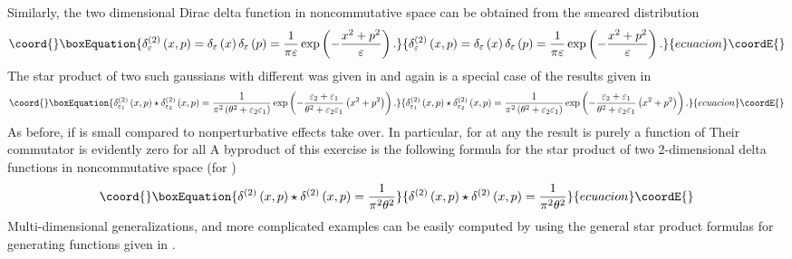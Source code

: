 \documentclass[a4paper,12pt]{article}
\begin{document}
Similarly, the two dimensional Dirac delta function in noncommutative space
can be obtained from the smeared distribution
\begin{equation}\coord{}\boxEquation{
\delta _{\varepsilon }^{\left( 2\right) }\left( x,p\right) =\delta
_{\varepsilon }\left( x\right) \delta _{\varepsilon }\left( p\right) =\frac{1
}{\pi \varepsilon }\exp \left( -\frac{x^{2}+p^{2}}{\varepsilon }\right) .
}{
\delta _{\varepsilon }^{\left( 2\right) }\left( x,p\right) =\delta
_{\varepsilon }\left( x\right) \delta _{\varepsilon }\left( p\right) =\frac{1
}{\pi \varepsilon }\exp \left( -\frac{x^{2}+p^{2}}{\varepsilon }\right) .
}{ecuacion}\coordE{}\end{equation}
The star product of two such gaussians with different \coordHE{} was given in \cite{bayen}\cite{baker} and again is a
special case of the results given in \cite{witmoy}
\begin{equation}\coord{}\boxEquation{
\delta _{\varepsilon _{1}}^{\left( 2\right) }\left( x,p\right) \star \delta
_{\varepsilon _{2}}^{\left( 2\right) }\left( x,p\right) =\frac{1}{\pi
^{2}\left( \theta ^{2}+\varepsilon _{2}\varepsilon _{1}\right) }\exp \left( -
\frac{\varepsilon _{2}+\varepsilon _{1}}{\theta ^{2}+\varepsilon
_{2}\varepsilon _{1}}\left( x^{2}+p^{2}\right) \right) .
}{
\delta _{\varepsilon _{1}}^{\left( 2\right) }\left( x,p\right) \star \delta
_{\varepsilon _{2}}^{\left( 2\right) }\left( x,p\right) =\frac{1}{\pi
^{2}\left( \theta ^{2}+\varepsilon _{2}\varepsilon _{1}\right) }\exp \left( -
\frac{\varepsilon _{2}+\varepsilon _{1}}{\theta ^{2}+\varepsilon
_{2}\varepsilon _{1}}\left( x^{2}+p^{2}\right) \right) .
}{ecuacion}\coordE{}\end{equation}
As before, if \coordHE{} is small compared to \coordHE{} nonperturbative effects take over. In particular, for \coordHE{} at any \coordHE{} the result is purely a
function of \coordHE{} Their commutator \coordHE{} is evidently zero for all \coordHE{}  \coordHE{} A byproduct of this exercise is the following formula for the star
product of two 2-dimensional delta functions in noncommutative space (for \coordHE{})
\begin{equation}\coord{}\boxEquation{
\delta ^{\left( 2\right) }\left( x,p\right) \star \delta ^{\left( 2\right)
}\left( x,p\right) =\frac{1}{\pi ^{2}\theta ^{2}}
}{
\delta ^{\left( 2\right) }\left( x,p\right) \star \delta ^{\left( 2\right)
}\left( x,p\right) =\frac{1}{\pi ^{2}\theta ^{2}}
}{ecuacion}\coordE{}\end{equation}
Multi-dimensional generalizations, and more complicated examples can be
easily computed by using the general star product formulas for generating
functions given in \cite{witmoy}.
\end{document}
